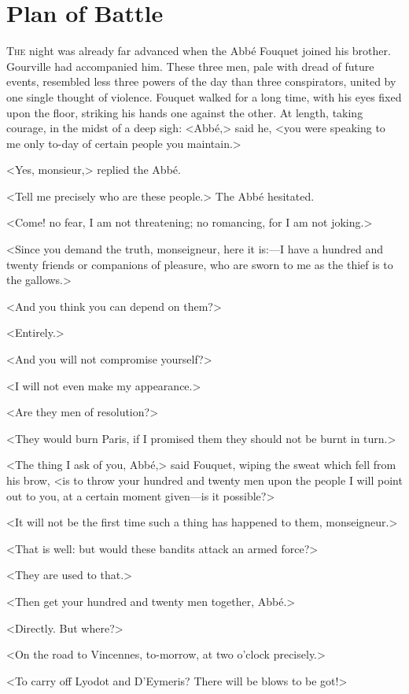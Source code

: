 \chapter{Plan of Battle}

\lettrine{T}{he} night was already far advanced when the Abbé Fouquet joined his brother. Gourville had accompanied him. These three men, pale with dread of future events, resembled less three powers of the day than three conspirators, united by one single thought of violence. Fouquet walked for a long time, with his eyes fixed upon the floor, striking his hands one against the other. At length, taking courage, in the midst of a deep sigh: <Abbé,> said he, <you were speaking to me only to-day of certain people you maintain.>

<Yes, monsieur,> replied the Abbé.

<Tell me precisely who are these people.> The Abbé hesitated.

<Come! no fear, I am not threatening; no romancing, for I am not joking.>

<Since you demand the truth, monseigneur, here it is:—I have a hundred and twenty friends or companions of pleasure, who are sworn to me as the thief is to the gallows.>

<And you think you can depend on them?>

<Entirely.>

<And you will not compromise yourself?>

<I will not even make my appearance.>

<Are they men of resolution?>

<They would burn Paris, if I promised them they should not be burnt in turn.>

<The thing I ask of you, Abbé,> said Fouquet, wiping the sweat which fell from his brow, <is to throw your hundred and twenty men upon the people I will point out to you, at a certain moment given—is it possible?>

<It will not be the first time such a thing has happened to them, monseigneur.>

<That is well: but would these bandits attack an armed force?>

<They are used to that.>

<Then get your hundred and twenty men together, Abbé.>

<Directly. But where?>

<On the road to Vincennes, to-morrow, at two o'clock precisely.>

<To carry off Lyodot and D'Eymeris? There will be blows to be got!>

